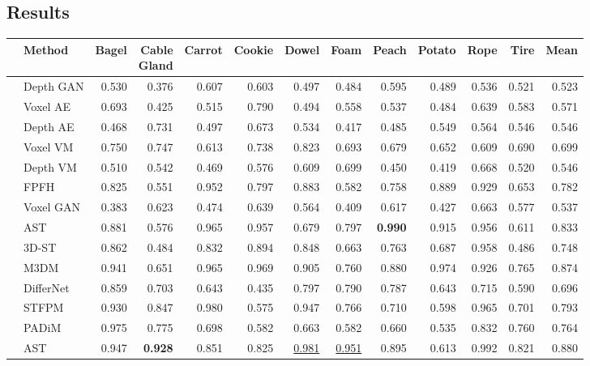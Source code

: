 \subsection*{Results}

\begin{table}[ht]
\centering
\begin{tabular}{cl|r|r|r|r|r|r|r|r|r|r|r}
\hline
& Method & Bagel & \makecell{Cable \\ Gland} & Carrot & Cookie & Dowel & Foam & Peach & Potato & Rope & Tire & Mean \\
\hline
\parbox[t]{0.5mm}{} & Depth GAN & 0.530 & 0.376 & 0.607 & 0.603 & 0.497 & 0.484 & 0.595 & 0.489 & 0.536 & 0.521 & 0.523 \\
& Voxel AE & 0.693 & 0.425 & 0.515 & 0.790 & 0.494 & 0.558 & 0.537 & 0.484 & 0.639 & 0.583 & 0.571 \\
& Depth AE & 0.468 & 0.731 & 0.497 & 0.673 & 0.534 & 0.417 & 0.485 & 0.549 & 0.564 & 0.546 & 0.546 \\
& Voxel VM & 0.750 & 0.747 & 0.613 & 0.738 & 0.823 & 0.693 & 0.679 & 0.652 & 0.609 & 0.690 & 0.699 \\
& Depth VM & 0.510 & 0.542 & 0.469 & 0.576 & 0.609 & 0.699 & 0.450 & 0.419 & 0.668 & 0.520 & 0.546 \\
& FPFH & 0.825 & 0.551 & 0.952 & 0.797 & 0.883 & 0.582 & 0.758 & 0.889 & 0.929 & 0.653 & 0.782 \\
& Voxel GAN & 0.383 & 0.623 & 0.474 & 0.639 & 0.564 & 0.409 & 0.617 & 0.427 & 0.663 & 0.577 & 0.537 \\
& AST & 0.881 & 0.576 & 0.965 & 0.957 & 0.679 & 0.797 & \textbf{0.990} & 0.915 & 0.956 & 0.611 & 0.833 \\
& 3D-ST & 0.862 & 0.484 & 0.832 & 0.894 & 0.848 & 0.663 & 0.763 & 0.687 & 0.958 & 0.486 & 0.748 \\
& M3DM & 0.941 & 0.651 & 0.965 & 0.969 & 0.905 & 0.760 & 0.880 & 0.974 & 0.926 & 0.765 & 0.874 \\
\hline
\parbox[t]{0.5mm}{} & DifferNet & 0.859 & 0.703 & 0.643 & 0.435 & 0.797 & 0.790 & 0.787 & 0.643 & 0.715 & 0.590 & 0.696 \\
& STFPM & 0.930 & 0.847 & 0.980 & 0.575 & 0.947 & 0.766 & 0.710 & 0.598 & 0.965 & 0.701 & 0.793 \\
& PADiM & 0.975 & 0.775 & 0.698 & 0.582 & 0.663 & 0.582 & 0.660 & 0.535 & 0.832 & 0.760 & 0.764 \\
& AST & 0.947 & \textbf{0.928} & 0.851 & 0.825 & \underline{0.981} & \underline{0.951} & 0.895 & 0.613 & 0.992 & 0.821 & 0.880 \\

\end{tabular}
\end{table}
